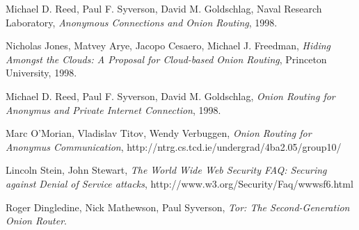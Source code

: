 \documentclass{acm_proc_article-sp}
\begin{document}
\begin{thebibliography}{9}

  Michael D. Reed, Paul F. Syverson, David M. Goldschlag, Naval Research Laboratory,
  \emph{Anonymous Connections and Onion Routing}, 1998.
  
  Nicholas Jones, Matvey Arye, Jacopo Cesaero, Michael J. Freedman,
  \emph{Hiding Amongst the Clouds: A Proposal for Cloud-based Onion Routing}, Princeton University, 1998.
  
  Michael D. Reed, Paul F. Syverson, David M. Goldschlag, 
  \emph{Onion Routing for Anonymus and Private Internet Connection}, 1998.
  
  Marc O'Morian, Vladislav Titov, Wendy Verbuggen, 
  \emph{Onion Routing for Anonymus Communication},
  http://ntrg.cs.tcd.ie/undergrad/4ba2.05/group10/
  
  Lincoln Stein, John Stewart, 
  \emph{The World Wide Web Security FAQ: Securing against Denial of Service attacks},
  http://www.w3.org/Security/Faq/wwwsf6.html
  
  Roger Dingledine, Nick Mathewson, Paul Syverson, 
  \emph{Tor: The Second-Generation Onion Router}.
  

\end{thebibliography}
\end{document}
